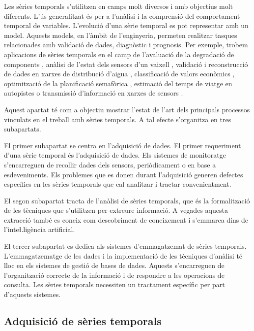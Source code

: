 Les sèries temporals s'utilitzen en camps molt diversos i amb
objectius molt diferents. L'ús generalitzat és per a l'anàlisi i la
comprensió del comportament temporal de variables. L'evolució d'una
sèrie temporal es pot representar amb un model. Aquests models, en
l'àmbit de l'enginyeria, permeten realitzar tasques relacionades amb
validació de dades, diagnòstic i prognosis.  Per exemple, trobem
aplicacions de sèries temporals en el camp de l'avaluació de la
degradació de components \parencite{yu11}, anàlisi de l'estat dels
sensors d'un vaixell \parencite{palmer07}, validació i reconstrucció
de dades en xarxes de distribució d'aigua \parencite{quevedo10},
classificació de valors econòmics \parencite{dreyer95}, optimització
de la planificació semafòrica \parencite{last11}, estimació del temps
de viatge en autopistes \parencite{soriguera10} o transmissió
d'informació en xarxes de
sensors \parencite{jainagrawal05,yaogehrke02}.


Aquest apartat té com a objectiu mostrar l'estat de l'art dels
principals processos vinculats en el treball amb sèries temporals. A
tal efecte s'organitza en tres subapartats.
 

El primer subapartat se centra en l'adquisició de dades. El primer
requeriment d'una sèrie temporal és l'adquisició de dades. Els
sistemes de monitoratge s'encarreguen de recollir dades dels sensors,
periòdicament o en base a esdeveniments.  Els problemes que es donen
durant l'adquisició generen defectes específics en les sèries
temporals que cal analitzar i tractar convenientment.


El segon subapartat tracta de l'anàlisi de sèries temporals, que és
la formalització de les tècniques que s'utilitzen per extreure
informació. A vegades aquesta extracció també es coneix com
descobriment de coneixement i s'emmarca dins de l'inte\l.ligència
artificial.


El tercer subapartat es dedica als sistemes d'emmagatzemat de sèries
temporals. L'emmagatzematge de les dades i la implementació de les
tècniques d'anàlisi té lloc en els sistemes de gestió de bases de
dades. Aquests s'encarreguen de l'organització correcte de la
informació i de respondre a les operacions de consulta. Les sèries
temporals necessiten un tractament específic per part d'aquests
sistemes.






\subsection{Adquisició de sèries temporals}

